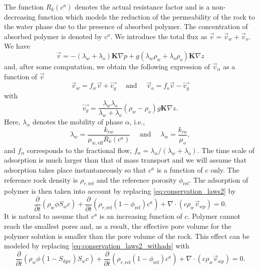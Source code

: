 \documentclass[11pt]{amsart}
\newcommand{\cads}{c^a}
\newcommand{\eff}{\mathrm{eff}}
\newcommand{\Kb}{{\bm{K}}}
\newcommand{\Sdpv}{\ensuremath{S_\text{dpv}} }
\newcommand{\fracpar}[2]{\frac{\partial #1}{\partial #2}}
\begin{document}
The function $R_k(\cads)$ denotes the actual resistance factor and is a non-decreasing function
which models the reduction of the permeability of the rock to the water phase due to the presence of
absorbed polymer. The concentration of absorbed polymer is denoted by $\cads$. We introduce the
total flux as $\vec{v} = \vec{v}_w + \vec{v}_o$. We have
\begin{equation*}
  \vec{v} = -(\lambda_w + \lambda_o)\Kb\nabla p + g(\lambda_w\rho_w + \lambda_o\rho_o)\Kb\nabla z 
\end{equation*}
and, after some computation, we obtain the following expression of $\vec{v}_\alpha$ as a function of
$\vec{v}$
\begin{equation}
  \label{eq:valphav}
  \vec{v}_w = f_w \vec{v} + \vec{v_g}\quad\text{ and }\quad  \vec{v}_o = f_o \vec{v} - \vec{v_g}
\end{equation}
with
\begin{equation}
  \label{eq:gravterm}
  \vec{v_g} = \frac{\lambda_w\lambda_{o}}{\lambda_w+\lambda_{o}}(\rho_w-\rho_{o})g\Kb\nabla z.
\end{equation}
Here, $\lambda_\alpha$ denotes the mobility of phase $\alpha$, i.e.,
\begin{equation*}
  \lambda_w = \frac{k_{rw}}{\mu_{w,\eff}R_k(\cads)}\quad\text{ and }\quad  \lambda_w = \frac{k_{ro}}{\mu_{o}},
\end{equation*}
and $f_\alpha$ corresponds to the fractional flow, $f_\alpha =\lambda_{\alpha}/(\lambda_{w} +
\lambda_{o})$. The time scale of adsorption is much larger than that of mass transport and we will
assume that adsorption takes place instantaneously so that $\cads$ is a function of $c$ only.  The
reference rock density is $\rho_{r, \text{ref}}$ and the reference porosity $\phi_\text{ref}$.  The
adsorption of polymer is then taken into account by replacing \eqref{eq:conservation_laws2} by
\begin{equation}
  \label{eq:conservation_laws2_withads}
  \frac{\partial}{\partial t} (\rho_{w}\phi S_w c)+
  \fracpar{}{t}\left(\rho_{r, \text{ref}}(1-\phi_\text{ref})\cads\right)+\nabla\cdot(c
  \rho_{w} \vec{v}_{wp})  = 0.
\end{equation}
It is natural to assume that $\cads$ is an increasing function of $c$. Polymer cannot reach the
smallest pores and, as a result, the effective pore volume for the polymer solution is smaller than
the pore volume of the rock. This effect can be modeled by replacing
\eqref{eq:conservation_laws2_withads} with
\begin{equation}
  \label{eq:sdpv1}
  \frac{\partial}{\partial t} (\rho_{w}\phi (1-\Sdpv)S_w c)+
  \fracpar{}{t}\left(\rho_{r, \text{ref}}(1-\phi_\text{ref})\cads\right)+\nabla\cdot(c
  \rho_{w} \vec{v}_{wp})  = 0.
\end{equation}
\end{document}
